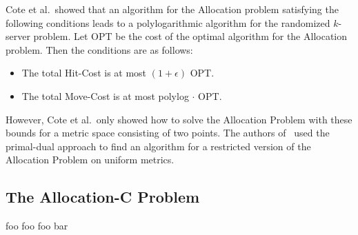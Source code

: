 Cote et al.\ showed that an algorithm for the Allocation problem satisfying the following conditions leads to a polylogarithmic algorithm for the randomized $k$-server problem.
Let OPT be the cost of the optimal algorithm for the Allocation problem.
Then the conditions are as follows:
\begin{itemize}
\item The total Hit-Cost is at most $(1 + \epsilon)$ OPT.
\item The total Move-Cost is at most polylog $\cdot$ OPT.
\end{itemize}
However, Cote et al.\ only showed how to solve the Allocation Problem with these bounds for a metric space consisting of two points.
The authors of~\cite{bansal10:k-server} used the primal-dual approach to find an algorithm for a restricted version of the Allocation Problem on uniform metrics.

\subsection{The Allocation-C Problem}
foo foo foo bar

